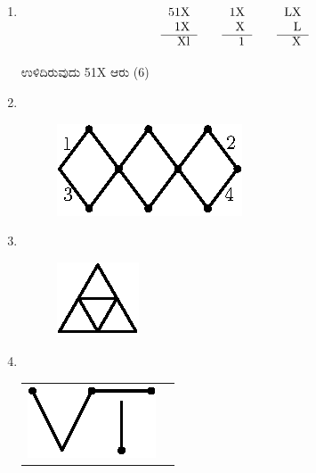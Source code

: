 \begin{enumerate}
\item 
\begin{equation*}
\begin{tabular}[t]{r}
51X \\
1X\\\cline{1-1} 
Xl
\end{tabular}
\quad\quad
\begin{tabular}[t]{r}
1X\\ 
X\\\cline{1-1} 
1
\end{tabular}
\quad\quad
\begin{tabular}[t]{r}
LX\\
L\\\cline{1-1}
X
\end{tabular}
\end{equation*}

ಉಳಿದಿರುವುದು 51X ಆರು (6)

\item 
~

\begin{figure}[H]
\centering
\includegraphics[scale=1.1]{images/chap4/ans13.eps}
\end{figure}



\item 
~
\phantom{a}
\vskip -0.8cm
\begin{figure}[H]
\centering
\includegraphics[scale=1.4]{images/chap4/ans14.eps}
\end{figure}


\item
~

\begin{tabular}[t]{cc}
\includegraphics[scale =0.8]{images/chap4/ans15.eps} & \raisebox{.3cm}{$= 1$}
\end{tabular}



\end{enumerate}
